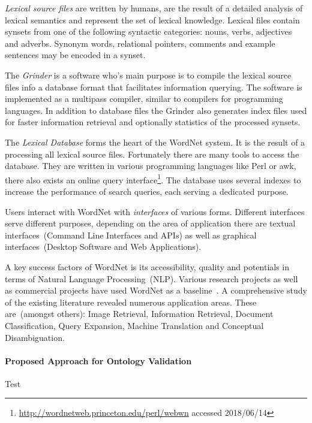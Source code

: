 \documentclass[draft,final]{vutinfth} %
\begin{document}
\textit{Lexical source files} are written by humans, are the result of a detailed analysis of lexical semantics and represent the set of lexical knowledge. Lexical files contain synsets from one of the following syntactic categories: nouns, verbs, adjectives and adverbs. Synonym words, relational pointers, comments and example sentences may be encoded in a synset. 

The \textit{Grinder} is a software who's main purpose is to compile the lexical source files info a database format that facilitates information querying. 
The software is implemented as a multipass compiler, similar to compilers for programming languages. In addition to database files the Grinder also generates index files used for faster information retrieval and optionally statistics of the processed synsets.  

The \textit{Lexical Database} forms the heart of the WordNet system. It is the result of a processing all lexical source files. Fortunately there are many tools to access the database. They are written in various programming languages like Perl or awk, there also exists an online query interface\footnote{\url{http://wordnetweb.princeton.edu/perl/webwn} accessed 2018/06/14}. The database uses several indexes to increase the performance of search queries, each serving a dedicated purpose. 

Users interact with WordNet with \textit{interfaces} of various forms. Different interfaces serve different purposes, depending on the area of application there are textual interfaces~(Command Line Interfaces and APIs) as well as graphical interfaces~(Desktop Software and Web Applications). 

A key success factors of WordNet is its accessibility, quality and potentials in terms of Natural Language Processing~(NLP). Various research projects as well as commercial projects have used WordNet as a baseline~\cite{morato2004}. A comprehensive study of the existing literature revealed numerous application areas. These are~(amongst others): Image Retrieval, Information Retrieval, Document Classification, Query Expansion, Machine Translation and Conceptual Disambiguation.



\paragraph{Proposed Approach for Ontology Validation} Test
\end{document}
